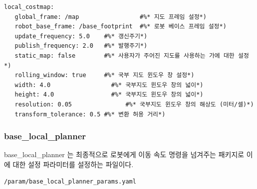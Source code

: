 \begin{lstlisting}[language=ROS]
local_costmap:
   global_frame: /map                 #%* 지도 프레임 설정*)
   robot_base_frame: /base_footprint  #%* 로봇 베이스 프레임 설정*)
   update_frequency: 5.0    #%* 갱신주기*)
   publish_frequency: 2.0   #%* 발행주기*)
   static_map: false        #%* 사용자가 주어진 지도를 사용하는 가에 대한 설정*)
   rolling_window: true     #%* 국부 지도 윈도우 창 설정*)
   width: 4.0                 #%* 국부지도 윈도우 창의 넓이*)
   height: 4.0                #%* 국부지도 윈도우 창의 넓이*)
   resolution: 0.05               #%* 국부지도 윈도우 창의 해상도 (미터/셀)*)
   transform_tolerance: 0.5 #%* 변환 허용 거리*)
\end{lstlisting}

\subsubsection{base\_local\_planner}
base\_local\_planner 는 최종적으로 로봇에게 이동 속도 명령을 넘겨주는 패키지로 이에 대한 설정 파라미터를 설정하는 파일이다.

\vspace{\baselineskip}
\begin{lstlisting}[language=ROS]
/param/base_local_planner_params.yaml
\end{lstlisting}

